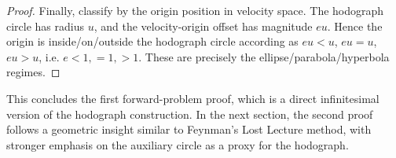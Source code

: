 \begin{proof}
Finally, classify by the origin position in velocity space.
The hodograph circle has radius $u$, and the velocity-origin offset has magnitude $eu$. Hence the origin is inside/on/outside the hodograph circle according as $eu<u$, $eu=u$, $eu>u$, i.e. $e<1,=1,>1$. These are precisely the ellipse/parabola/hyperbola regimes.
\end{proof}
This concludes the first forward-problem proof, which is a direct infinitesimal version of the hodograph construction. In the next section, the second proof follows a geometric insight similar to Feynman's Lost Lecture method, with stronger emphasis on the auxiliary circle as a proxy for the hodograph.
